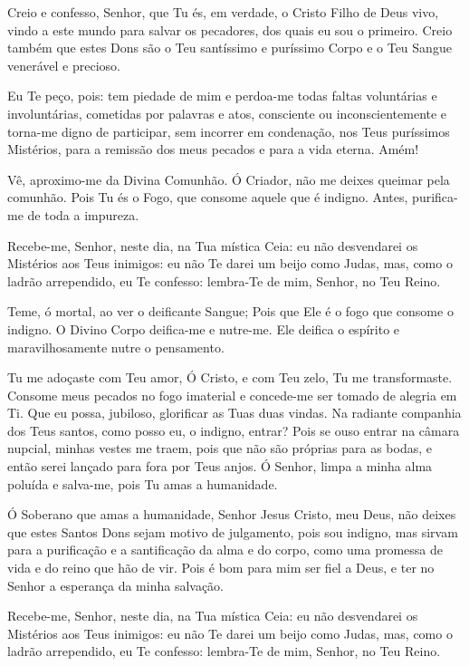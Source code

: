 \documentclass{subfiles}
\begin{document}
Creio e confesso, Senhor, que Tu és, em verdade, o Cristo Filho de Deus vivo,
vindo a este mundo para salvar os pecadores, dos quais eu sou o primeiro. Creio
também que estes Dons são o Teu santíssimo e puríssimo Corpo e o Teu Sangue
venerável e precioso.

Eu Te peço, pois: tem piedade de mim e perdoa-me todas faltas voluntárias e
involuntárias, cometidas por palavras e atos, consciente ou inconscientemente e
torna-me digno de participar, sem incorrer em condenação, nos Teus puríssimos
Mistérios, para a remissão dos meus pecados e para a vida eterna. Amém!


Vê, aproximo-me da Divina Comunhão.
Ó Criador, não me deixes queimar pela comunhão.
Pois Tu és o Fogo, que consome aquele que é indigno.
Antes, purifica-me de toda a impureza.


Recebe-me, Senhor, neste dia, na Tua mística Ceia: eu não desvendarei os
Mistérios aos Teus inimigos: eu não Te darei um beijo como Judas, mas, como o
ladrão arrependido, eu Te confesso: lembra-Te de mim, Senhor, no Teu Reino.


Teme, ó mortal, ao ver o deificante Sangue;
Pois que Ele é o fogo que consome o indigno.
O Divino Corpo deifica-me e nutre-me.
Ele deifica o espírito e maravilhosamente nutre o pensamento.


Tu me adoçaste com Teu amor, Ó Cristo, e com Teu zelo, Tu me transformaste.
Consome meus pecados no fogo imaterial e concede-me ser tomado de alegria em Ti.
Que eu possa, jubiloso, glorificar as Tuas duas vindas. Na radiante companhia
dos Teus santos, como posso eu, o indigno, entrar? Pois se ouso entrar na câmara
nupcial, minhas vestes me traem, pois que não são próprias para as bodas, e
então serei lançado para fora por Teus anjos. Ó Senhor, limpa a minha alma
poluída e salva-me, pois Tu amas a humanidade.


Ó Soberano que amas a humanidade, Senhor Jesus Cristo, meu Deus, não deixes que
estes Santos Dons sejam motivo de julgamento, pois sou indigno, mas sirvam para
a purificação e a santificação da alma e do corpo, como uma promessa de vida e
do reino que hão de vir. Pois é bom para mim ser fiel a Deus, e ter no Senhor a
esperança da minha salvação.


Recebe-me, Senhor, neste dia, na Tua mística Ceia: eu não desvendarei os
Mistérios aos Teus inimigos: eu não Te darei um beijo como Judas, mas, como o
ladrão arrependido, eu Te confesso: lembra-Te de mim, Senhor, no Teu Reino.
\end{document}
